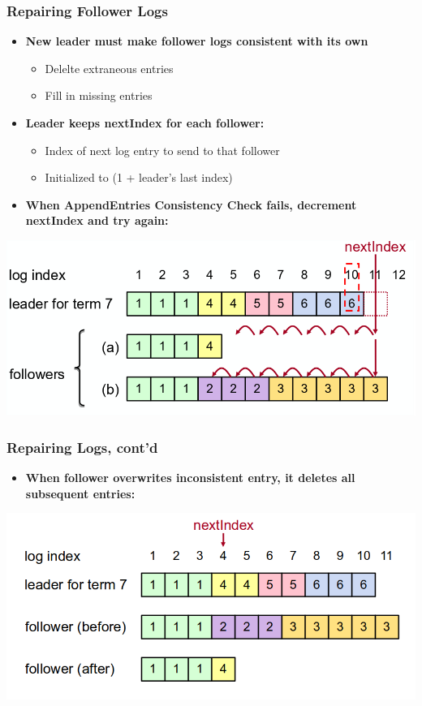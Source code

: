 \begin{frame}
    \frametitle{Repairing Follower Logs}
    \begin{itemize}
        \item \textbf{New leader must make follower logs consistent with its own}
            \begin{itemize}
                \item Delelte extraneous entries
                \item Fill in missing entries
            \end{itemize}
        \item \textbf{Leader keeps nextIndex for each follower:}
            \begin{itemize}
                \item Index of next log entry to send to that follower
                \item Initialized to (1 + leader's last index)
            \end{itemize}
        \item \textbf{When AppendEntries Consistency Check fails, decrement nextIndex and try again:}
    \end{itemize}
    \centering
    \includegraphics[scale=0.3]{./figures/raft-repairing-follower-logs.png}
\end{frame}

\begin{frame}
    \frametitle{Repairing Logs, cont'd}
    \begin{itemize}
        \item \textbf{When follower overwrites inconsistent entry, it deletes all subsequent entries:}
    \end{itemize}
    \centering
    \includegraphics[scale=0.3]{./figures/raft-repariring-follower-logs2.png}
\end{frame}

